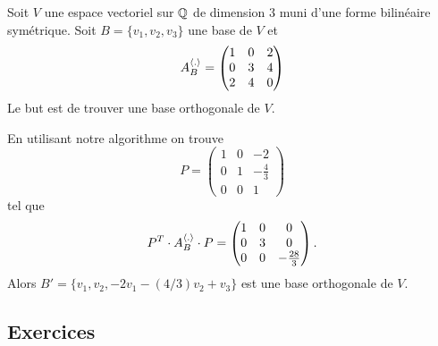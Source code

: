 \begin{example}
  \label{exe:15}
  Soit $V$ une espace vectoriel sur $\mathbb{Q}$ de dimension $3$ muni d'une forme bilinéaire symétrique. Soit $B = \{v_1,v_2,v_3\}$ une base de $V$ et 
  \begin{displaymath}
    A^{\langle {.} \rangle}_B =
    \begin{pmatrix}
      1 & 0 & 2\\
      0 & 3 & 4\\
      2 & 4 & 0 
    \end{pmatrix}
  \end{displaymath}
Le but est de trouver une  base orthogonale de $V$. 

En utilisant notre algorithme on trouve 
\begin{displaymath}
  P = 
  \begin{pmatrix}
    
1 & 0 & -2 \\
0 & 1 & -\frac{4}{3} \\
0 & 0 & 1
  \end{pmatrix}
\end{displaymath}
tel que 
\begin{displaymath}
  P^T \cdot A^{\langle {.} \rangle}_B \cdot P =
  \begin{pmatrix}
    1 & 0 & 0 \\
0 & 3 & 0 \\
0 & 0 & -\frac{28}{3}
  \end{pmatrix}. 
\end{displaymath}
Alors $B' = \{v_1,v_2,-2v_1 -(4/3) v_2 + v_3\}$ est une base orthogonale de $V$. 
\end{example}


\subsection*{Exercices}

